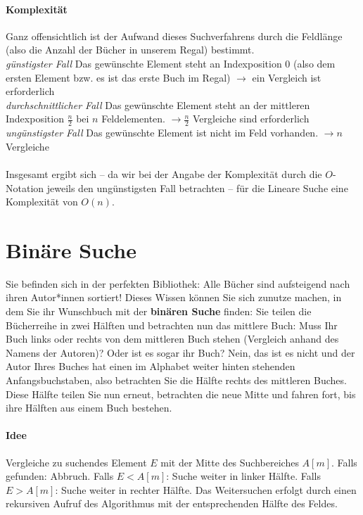 \documentclass[11pt,a4paper]{scrartcl}
\begin{document}
\paragraph{Komplexität}
Ganz offensichtlich ist der Aufwand dieses Suchverfahrens durch die Feldlänge (also die Anzahl der Bücher in unserem Regal) bestimmt. \\
\textit{günstigster Fall} \quad Das gewünschte Element steht an Indexposition 0 (also dem ersten Element bzw. es ist das erste Buch im Regal) $\to$ ein Vergleich ist erforderlich
\\
\textit{durchschnittlicher Fall} \quad Das gewünschte Element steht an der mittleren Indexposition $\frac{n}{2}$ bei $n$ Feldelementen. $\to \frac{n}{2}$ Vergleiche sind erforderlich
\\
\textit{ungünstigster Fall} \quad Das gewünschte Element ist nicht im Feld vorhanden. $\to n$ Vergleiche
\\\\
Insgesamt ergibt sich -- da wir bei der Angabe der Komplexität durch die $O$-Notation jeweils den ungünstigsten Fall betrachten -- für die Lineare Suche eine Komplexität von $O(n)$. 
\section{Binäre Suche}
Sie befinden sich in der perfekten Bibliothek: Alle Bücher sind aufsteigend nach ihren Autor*innen sortiert! Dieses Wissen können Sie sich zunutze machen, in dem Sie ihr Wunschbuch mit der \textbf{binären Suche} finden: Sie teilen die Bücherreihe in zwei Hälften und betrachten nun das mittlere Buch: Muss Ihr Buch links oder rechts von dem mittleren Buch stehen (Vergleich anhand des Namens der Autoren)? Oder ist es sogar ihr Buch? Nein, das ist es nicht und der Autor Ihres Buches hat einen im Alphabet weiter hinten stehenden Anfangsbuchstaben, also betrachten Sie die Hälfte rechts des mittleren Buches. Diese Hälfte teilen Sie nun erneut, betrachten die neue Mitte und fahren fort, bis ihre Hälften aus einem Buch bestehen.
\paragraph{Idee} Vergleiche zu suchendes Element $E$ mit der Mitte des Suchbereiches $A[m]$. Falls gefunden: Abbruch. Falls $E < A[m]$: Suche weiter in linker Hälfte. Falls $E > A[m]$: Suche weiter in rechter Hälfte. Das Weitersuchen erfolgt durch einen rekursiven Aufruf des Algorithmus mit der entsprechenden Hälfte des Feldes.
\end{document}
